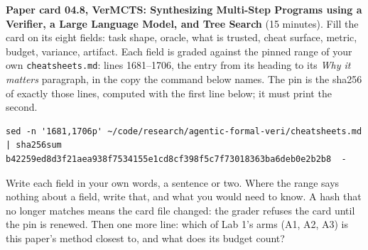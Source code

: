 \documentclass[11pt]{article}
\begin{document}
\begin{problem}\label{prob:B5}
\textbf{Paper card 04.8, VerMCTS: Synthesizing Multi-Step Programs using a Verifier, a Large Language Model, and Tree Search} (15 minutes). Fill the card on its eight
fields: task shape, oracle, what is trusted, cheat surface, metric, budget,
variance, artifact. Each field is graded against the pinned range of your own
\texttt{cheatsheets.md}: lines 1681--1706, the entry from its heading to its
\emph{Why it matters} paragraph, in the copy the command below names. The pin
is the sha256 of exactly those lines, computed with the first line below; it
must print the second.
{\small
\begin{verbatim}
sed -n '1681,1706p' ~/code/research/agentic-formal-veri/cheatsheets.md | sha256sum
b42259ed8d3f21aea938f7534155e1cd8cf398f5c7f73018363ba6deb0e2b2b8  -
\end{verbatim}
}
Write each field in your own words, a sentence or two. Where the range says
nothing about a field, write that, and what you would need to know. A hash
that no longer matches means the card file changed: the grader refuses the
card until the pin is renewed. Then one more line: which of Lab 1's arms
(A1, A2, A3) is this paper's method closest to, and what does its budget count?
\end{problem}
\end{document}
